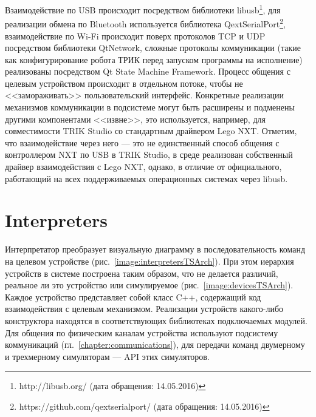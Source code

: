 \documentclass[conference]{IEEEtran}
\begin{document}
Взаимодействие по USB происходит посредством библиотеки libusb\footnote{http://libusb.org/ (дата обращения: 14.05.2016)}, для реализации обмена по Bluetooth используется библиотека QextSerialPort\footnote{https://github.com/qextserialport/ (дата обращения: 14.05.2016)}, взаимодействие по Wi-Fi происходит поверх протоколов TCP и UDP посредством библиотеки QtNetwork, сложные протоколы коммуникации (такие как конфигурирование робота ТРИК перед запуском программы на исполнение) реализованы посредством Qt State Machine Framework. Процесс общения с целевым устройством происходит в отдельном потоке, чтобы не <<замораживать>> пользовательский интерфейс. Конкретные реализации механизмов коммуникации в подсистеме могут быть расширены и подменены другими компонентами <<извне>>, это используется, например, для совместимости TRIK Studio со стандартным драйвером Lego NXT. Отметим, что взаимодействие через него --- это не единственный способ общения с контроллером NXT по USB в TRIK Studio, в среде реализован собственный драйвер взаимодействия с Lego NXT, однако, в отличие от официального, работающий на всех поддерживаемых операционных системах через libusb.

\section{Interpreters}
\label{chapter:interpreters}

Интерпретатор преобразует визуальную диаграмму в последовательность команд на целевом устройстве (рис.~\ref{image:interpretersTSArch}). При этом иерархия устройств в системе построена таким образом, что не делается различий, реальное ли это устройство или симулируемое (рис.~\ref{image:devicesTSArch}). Каждое устройство представляет собой класс C++, содержащий код взаимодействия с целевым механизмом. Реализации устройств какого-либо конструктора находятся в соответствующих библиотеках подключаемых модулей. Для общения по физическим каналам устройства используют подсистему коммуникаций (гл.~\ref{chapter:communications}), для передачи команд двумерному и трехмерному симуляторам --- API этих симуляторов.
\end{document}
